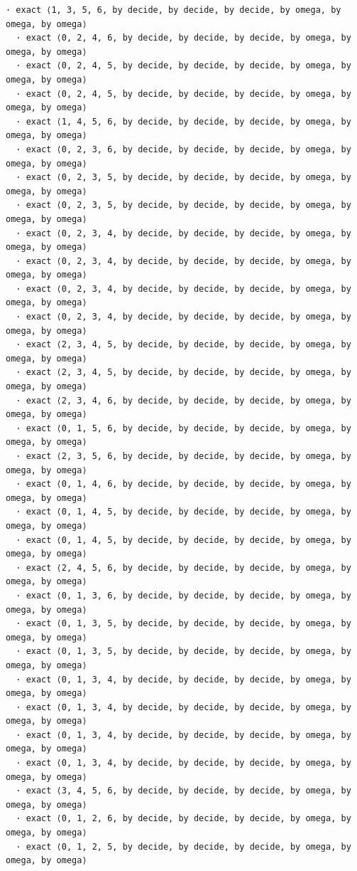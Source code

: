 \documentclass[11pt,a4paper]{article}
\begin{document}
\begin{Verbatim}[breaklines,breakanywhere,fontsize=\footnotesize]
  · exact ⟨1, 3, 5, 6, by decide, by decide, by decide, by omega, by omega, by omega⟩
  · exact ⟨0, 2, 4, 6, by decide, by decide, by decide, by omega, by omega, by omega⟩
  · exact ⟨0, 2, 4, 5, by decide, by decide, by decide, by omega, by omega, by omega⟩
  · exact ⟨0, 2, 4, 5, by decide, by decide, by decide, by omega, by omega, by omega⟩
  · exact ⟨1, 4, 5, 6, by decide, by decide, by decide, by omega, by omega, by omega⟩
  · exact ⟨0, 2, 3, 6, by decide, by decide, by decide, by omega, by omega, by omega⟩
  · exact ⟨0, 2, 3, 5, by decide, by decide, by decide, by omega, by omega, by omega⟩
  · exact ⟨0, 2, 3, 5, by decide, by decide, by decide, by omega, by omega, by omega⟩
  · exact ⟨0, 2, 3, 4, by decide, by decide, by decide, by omega, by omega, by omega⟩
  · exact ⟨0, 2, 3, 4, by decide, by decide, by decide, by omega, by omega, by omega⟩
  · exact ⟨0, 2, 3, 4, by decide, by decide, by decide, by omega, by omega, by omega⟩
  · exact ⟨0, 2, 3, 4, by decide, by decide, by decide, by omega, by omega, by omega⟩
  · exact ⟨2, 3, 4, 5, by decide, by decide, by decide, by omega, by omega, by omega⟩
  · exact ⟨2, 3, 4, 5, by decide, by decide, by decide, by omega, by omega, by omega⟩
  · exact ⟨2, 3, 4, 6, by decide, by decide, by decide, by omega, by omega, by omega⟩
  · exact ⟨0, 1, 5, 6, by decide, by decide, by decide, by omega, by omega, by omega⟩
  · exact ⟨2, 3, 5, 6, by decide, by decide, by decide, by omega, by omega, by omega⟩
  · exact ⟨0, 1, 4, 6, by decide, by decide, by decide, by omega, by omega, by omega⟩
  · exact ⟨0, 1, 4, 5, by decide, by decide, by decide, by omega, by omega, by omega⟩
  · exact ⟨0, 1, 4, 5, by decide, by decide, by decide, by omega, by omega, by omega⟩
  · exact ⟨2, 4, 5, 6, by decide, by decide, by decide, by omega, by omega, by omega⟩
  · exact ⟨0, 1, 3, 6, by decide, by decide, by decide, by omega, by omega, by omega⟩
  · exact ⟨0, 1, 3, 5, by decide, by decide, by decide, by omega, by omega, by omega⟩
  · exact ⟨0, 1, 3, 5, by decide, by decide, by decide, by omega, by omega, by omega⟩
  · exact ⟨0, 1, 3, 4, by decide, by decide, by decide, by omega, by omega, by omega⟩
  · exact ⟨0, 1, 3, 4, by decide, by decide, by decide, by omega, by omega, by omega⟩
  · exact ⟨0, 1, 3, 4, by decide, by decide, by decide, by omega, by omega, by omega⟩
  · exact ⟨0, 1, 3, 4, by decide, by decide, by decide, by omega, by omega, by omega⟩
  · exact ⟨3, 4, 5, 6, by decide, by decide, by decide, by omega, by omega, by omega⟩
  · exact ⟨0, 1, 2, 6, by decide, by decide, by decide, by omega, by omega, by omega⟩
  · exact ⟨0, 1, 2, 5, by decide, by decide, by decide, by omega, by omega, by omega⟩

\end{Verbatim}
\end{document}
